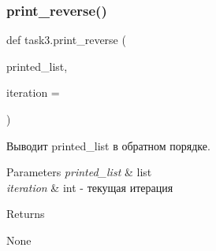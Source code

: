 \subsubsection{\texorpdfstring{print\+\_\+reverse()}{print\_reverse()}}
{\footnotesize\ttfamily def task3.\+print\+\_\+reverse (\begin{DoxyParamCaption}\item[{}]{printed\+\_\+list,  }\item[{}]{iteration = {} }\end{DoxyParamCaption})}



Выводит printed\+\_\+list в обратном порядке. 


\begin{DoxyParams}{Parameters}
{\em printed\+\_\+list} & list \\
\hline
{\em iteration} & int -\/ текущая итерация\\
\hline
\end{DoxyParams}
\begin{DoxyReturn}{Returns}


None 
\end{DoxyReturn}
